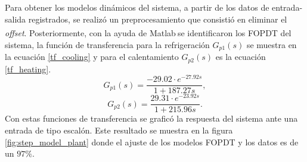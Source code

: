 \\ \\
Para obtener los modelos dinámicos del sistema, a partir de los datos de entrada-salida registrados, se realizó un preprocesamiento que consistió en eliminar el \textit{offset}. Posteriormente, con la ayuda de Matlab\textsuperscript \textregistered $~$se identificaron los FOPDT del sistema, la función de transferencia para la refrigeración $G_{p1}(s)$ se muestra en la ecuación \ref{tf_cooling} y para el calentamiento $G_{p2}(s)$ es la ecuación \ref{tf_heating}.
\begin{equation}
G_{p1}(s)=  \frac{-29.02\cdot e^{-27.92 s}}{1+187.27 s},
\label{tf_cooling}
\end{equation}
\begin{equation}
G_{p2}(s)=  \frac{29.31\cdot e^{-23.92 s}}{1+215.96 s}.
\label{tf_heating}
\end{equation}
Con estas funciones de transferencia se graficó la respuesta del sistema ante una entrada de tipo escalón. Este resultado se muestra en la figura \ref{fig:step_model_plant} donde el ajuste de los modelos FOPDT y los datos es de un $97\%$.
